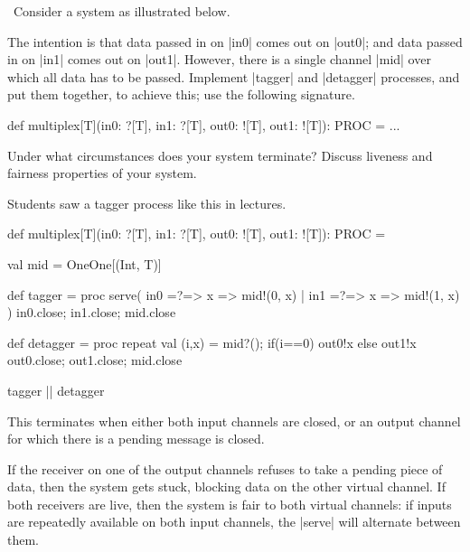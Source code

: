 \begin{question}
\Programming\ 
Consider a system as illustrated below.
%
\begin{center}
\end{center}
%
The intention is that data passed in on |in0| comes out on |out0|; and data
passed in on |in1| comes out on |out1|.  However, there is a single channel
|mid| over which all data has to be passed.  Implement |tagger| and |detagger|
processes, and put them together, to achieve this; use the following
signature. 
%
\begin{scala}
  def multiplex[T](in0: ?[T], in1: ?[T], out0: ![T], out1: ![T]): PROC = ...
\end{scala}

Under what circumstances does your system terminate?  Discuss liveness and
fairness properties of your system.
\end{question}


\begin{answer}
Students saw a tagger process like this in lectures.
%
\begin{scala}
  def multiplex[T](in0: ?[T], in1: ?[T], out0: ![T], out1: ![T]): PROC = {
    val mid = OneOne[(Int, T)]

    def tagger = proc{
      serve(
        in0 =?=> { x => mid!(0, x) }
        | in1 =?=> { x => mid!(1, x) }
      )
      in0.close; in1.close; mid.close
    }

    def detagger = proc{
      repeat{
        val (i,x) = mid?(); if(i==0) out0!x else out1!x
      }
      out0.close; out1.close; mid.close
    }
   
    tagger || detagger
  }
\end{scala}

This terminates when either both input channels are closed, or an output
channel for which there is a pending message is closed.  

If the receiver on one of the output channels refuses to take a pending piece
of data, then the system gets stuck, blocking data on the other virtual
channel.  If both receivers are live, then the system is fair to both virtual
channels: if inputs are repeatedly available on both input channels, the
|serve| will alternate between them.
\end{answer}
